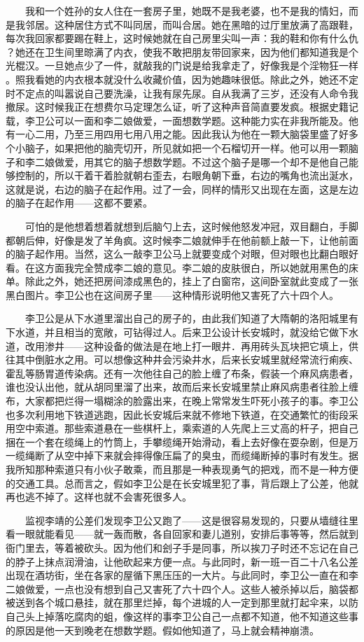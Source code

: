  　　我和一个姓孙的女人住在一套房子里，她既不是我老婆，也不是我的情妇，而 是我邻居。这种居住方式不叫同居，而叫合居。她在黑暗的过厅里放满了高跟鞋， 每次我回家都要踢在鞋上，这时候她就在自己房里尖叫一声：我的鞋和你有什么仇 ？她还在卫生间里晾满了内衣，使我不敢把朋友带回家来，因为他们都知道我是个 光棍汉。一旦她点少了一件，就敲我的门说是给我拿走了，好像我是个淫物狂一样 。照我看她的内衣根本就没什么收藏价值，因为她趣味很低。除此之外，她还不定 时不定点的叫嚣说自己要洗澡，让我有尿先尿。自从我满了三岁，还没有人命令我 撤尿。这时候我正在想费尔马定理怎么证，听了这种声音简直要发疯。根据史籍记 载，李卫公可以一面和李二娘做爱，一面想数学题。这种能力实在非我所能及。他 有一心二用，乃至三用四用七用八用之能。因此我认为他在一颗大脑袋里盛了好多 个小脑子，如果把他的脑壳切开，所见就如把一个石榴切开一样。他可以用一颗脑 子和李二娘做爱，用其它的脑子想数学题。不过这个脑子是哪一个却不是他自己能 够控制的，所以干着干着脸就朝右歪去，右眼角朝下垂，右边的嘴角也流出涎水， 这就是说，右边的脑子在起作用。过了一会，同样的情形又出现在左面，这是左边 的脑子在起作用——这都不要紧。

 　　可怕的是他想着想着就想到后脑勺上去，这时候他怒发冲冠，双目翻白，手脚 都朝后伸，好像是发了羊角疯。这时候李二娘就伸手在他前额上敲一下，让他前面 的脑子起作用。当然，这么一敲李卫公马上就要变成个对眼，但对眼也比翻白眼好 看。在这方面我完全赞成李二娘的意见。李二娘的皮肤很白，所以她就用黑色的床 单。除此之外，她还把房间漆成黑色的，挂上了白窗帘，这间卧室就此变成了一张 黑白图片。李卫公也在这间房子里——这种情形说明他又害死了六十四个人。

 　　李卫公是从下水道里溜出自己的房子的，由此我们知道了大隋朝的洛阳城里有 下水道，并且相当的宽敞，可钻得过人。后来卫公设计长安城时，就没给它做下水 道，改用渗井——这种设备的做法是在地上打一眼井．再用砖头瓦块把它填上，供 往其中倒脏水之用。可以想像这种井会污染井水，后来长安城里就经常流行痢疾、 霍乱等肠胃道传染病。还有一次他往自己的脸上缠了布条，假装一个麻风病患者， 谁也没认出他，就从胡同里溜了出来，故而后来长安城里禁止麻风病患者往脸上缠 布，大家都把烂得一塌糊涂的脸露出来，在晚上常常发生吓死小孩子的事。李卫公 也多次利用地下铁道逃跑，因此长安城后来就不修地下铁道，在交通繁忙的街段采 用空中索道。那些索道悬在一些棋杆上，乘索道的人先爬上三丈高的杆子，把自己 捆在一个套在缆绳上的竹筒上，手攀缆绳开始滑动，看上去好像在耍杂剧，但是万 一缆绳断了从空中掉下来就会摔得像压扁了的臭虫，而缆绳断掉的事时有发生。据 我所知那种索道只有小伙子敢乘，而且那是一种表现勇气的把戏，而不是一种方便 的交通工具。总而言之，假如李卫公是在长安城里犯了事，背后跟上了公差，他就 再也逃不掉了。这样也就不会害死很多人。 

　　监视李靖的公差们发现李卫公又跑了——这是很容易发现的，只要从墙缝往里 看一眼就能看见——就一轰而散，各自回家和妻儿道别，安排后事等等，然后就到 衙门里去，等着被砍头。因为他们和刽子手是同事，所以挨刀子时还不忘记在自己 的脖子上抹点润滑油，让他砍起来方便一点。与此同时，新一班一百二十八名公差 出现在酒坊街，坐在各家的屋循下黑压压的一大片。与此同时，李卫公一直在和李 二娘做爱，一点也没有想到自己又害死了六十四个人。这些人被杀掉以后，脑袋都 被送到各个城口悬挂，就在那里烂掉，每个进城的人一定到那里就打起伞来，以防 自己头上掉落吃腐肉的蛆，像这样的事李卫公自己一点都不知道，他不知道这些事 的原因是他一天到晚老在想数学题。假如他知道了，马上就会精神崩溃。 
 
